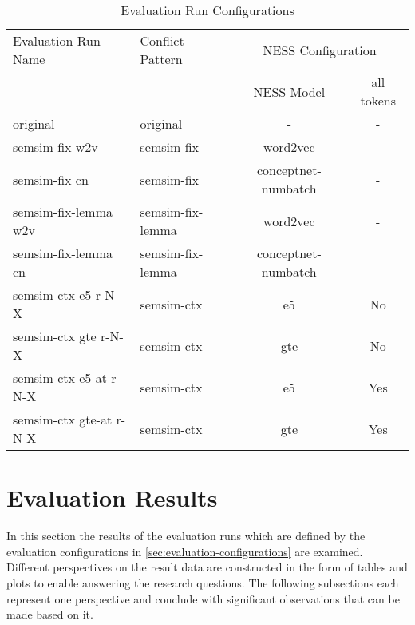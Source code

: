 \documentclass[11pt]{scrreprt}
\begin{document}
\begin{table}
\centering
\begin{tabular}{llcc}
\toprule
\multicolumn{1}{l}{Evaluation Run Name} & \multicolumn{1}{l}{Conflict Pattern} & \multicolumn{2}{c}{NESS Configuration} \\
\cmidrule{3-4}
\multicolumn{1}{l}{}   & \multicolumn{1}{l}{}  & \multicolumn{1}{c}{NESS Model}	& \multicolumn{1}{c}{all tokens} \\
\midrule
original                       & original                     & -                          & -                \\
semsim-fix w2v                 & semsim-fix                   & word2vec                   & -                \\
semsim-fix cn                 & semsim-fix                   & conceptnet-numbatch                      & -      \\
semsim-fix-lemma w2v           & semsim-fix-lemma             & word2vec                   & -                \\
semsim-fix-lemma cn           & semsim-fix-lemma             & conceptnet-numbatch                      & -      \\
semsim-ctx e5 r-N-X                & semsim-ctx                   & e5                         & No           \\
semsim-ctx gte r-N-X              & semsim-ctx                   & gte                        & No            \\
semsim-ctx e5-at r-N-X             & semsim-ctx                   & e5                         & Yes          \\
semsim-ctx gte-at r-N-X           & semsim-ctx                   & gte                        & Yes           \\
\end{tabular}
\caption{Evaluation Run Configurations}
\label{tab:evaluation-run-configs}
\end{table}




\section{Evaluation Results}
\label{sec:evaluation-results}
In this section the results of the evaluation runs which are defined by the evaluation configurations in \cref{sec:evaluation-configurations} are examined. Different perspectives on the result data are constructed in the form of tables and plots to enable answering the research questions. The following subsections each represent one perspective and conclude with significant observations that can be made based on it.
\end{document}
